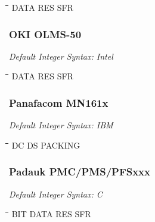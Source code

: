 {\tt\begin{tabbing} 
\hspace{3cm}\=\hspace{3cm}\=\hspace{3cm}\=\hspace{3cm}\=\kill
DATA       \> RES         \> SFR \\
\end{tabbing}}

\subsubsection{OKI OLMS-50}

{\em Default Integer Syntax: Intel}

{\tt\begin{tabbing} 
\hspace{3cm}\=\hspace{3cm}\=\hspace{3cm}\=\hspace{3cm}\=\kill
DATA       \> RES         \> SFR \\
\end{tabbing}}

\subsubsection{Panafacom MN161x}

{\em Default Integer Syntax: IBM}

{\tt\begin{tabbing}
\hspace{3cm}\=\hspace{3cm}\=\hspace{3cm}\=\hspace{3cm}\=\kill
DC         \> DS          \> PACKING \\
\end{tabbing}}

\subsubsection{Padauk PMC/PMS/PFSxxx}

{\em Default Integer Syntax: C}

{\tt\begin{tabbing}
\hspace{3cm}\=\hspace{3cm}\=\hspace{3cm}\=\hspace{3cm}\=\kill
BIT        \> DATA       \> RES       \> SFR \\
\end{tabbing}}

